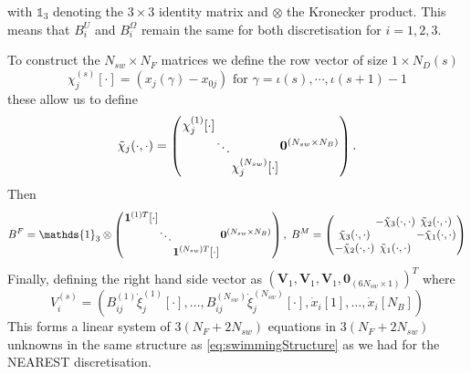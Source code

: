 with $\mathds{1}_{3}$ denoting the $3\times3$ identity matrix and $\otimes$ the Kronecker product. This means that $B^U_i$ and $B_i^\Omega$ remain the same for both discretisation for $i=1,2,3$. 

To construct the $N_{sw} \times N_F$ matrices we define the row vector of size $1 \times N_D(s)$ 
\begin{equation*}
    \chi_j^{(s)}[\cdot] = (x_j(\gamma) - x_{0 j}) \text{ for } \gamma = \iota(s),\cdots,\iota(s+1)-1
\end{equation*}
these allow us to define
\begin{equation*}
\arraycolsep=0.4pt\def\arraystretch{1}
    \tilde{\chi}_j(\cdot,\cdot)=\left(\begin{array}{cc}
         \begin{array}{ccc}
             \chi_j^{(1)}[\cdot] & & \\
              & \ddots & \\
              & & \chi_j^{(N_{sw})}[\cdot]
         \end{array} & \bm{0}^{(N_{sw} \times N_B)}
    \end{array}\right).
\end{equation*}
Then
\begin{equation*}
\arraycolsep=0.4pt\def\arraystretch{1}
    B^F = \mathds{1}_{3} \otimes \left(\begin{array}{cc}
         \begin{array}{ccc}
             \bm{1}^{(1)T}[\cdot] & & \\
              & \ddots & \\
              & & \bm{1}^{(N_{sw})T}[\cdot]
         \end{array} & \bm{0}^{(N_{sw} \times N_B)}
    \end{array}\right), \;
    B^M =
    \left(\begin{array}{ccc}
             & -\tilde{\chi}_3(\cdot,\cdot) & \tilde{\chi}_2(\cdot,\cdot)\\
            \tilde{\chi}_3(\cdot,\cdot) & & -\tilde{\chi}_1(\cdot,\cdot)\\
            -\tilde{\chi}_2(\cdot,\cdot) & \tilde{\chi}_1(\cdot,\cdot) &
          \end{array}\right)
\end{equation*}
Finally, defining the right hand side vector as $(\bm{V}_1,\bm{V}_1,\bm{V}_1,\bm{0}_{(6N_{sw} \times 1)})^T$ where
\begin{equation*}
    V_i^{(s)} = (B_{ij}^{(1)}\dot{\xi}_j^{(1)}[\cdot],\dots,B_{ij}^{(N_{sw})}\dot{\xi}_j^{(N_{sw})}[\cdot],\dot{x}_i[1],\dots,\dot{x}_i[N_B])
\end{equation*}
This forms a linear system of $3(N_F+2N_{sw})$ equations in $3(N_F+2N_{sw})$ unknowns in the same structure as \cref{eq:swimmingStructure} as we had for the NEAREST discretisation.


